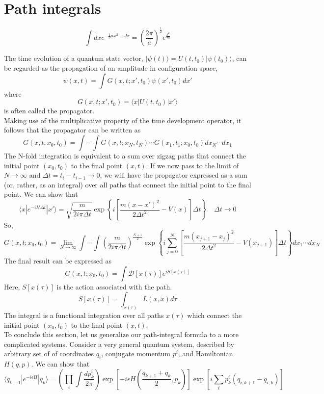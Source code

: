 \section{Path integrals}
\begin{newthem}
\[\int dx e^{-\frac{1}{2} ax^2 + Jx} = \left( \frac{2\pi}{a}\right)^{\frac{1}{2}} e^{\frac{J^2}{2a}}\]
\end{newthem}
The time evolution of a quantum state vector, $|\psi(t)\rangle = U(t,t_0)| \psi(t_0)\rangle$, can be regarded as the propagation of an amplitude in configuration space,
\[\psi(x,t) = \int G(x,t;x',t_0) \psi(x',t_0)dx'\]
where
\[G(x,t;x',t_0) = \langle x | U(t,t_0) | x' \rangle\]
is often called the propagator. \\
Making use of the multiplicative property of the time development operator, it follows that the propagator can be written as
\[G(x,t;x_0,t_0) = \int \cdots \int G(x,t;x_N,t_N) \cdots G(x_1,t_1;x_0,t_0) dx_N \cdots dx_1\]
The N-fold integration is equivalent to a sum over zigzag paths that connect the initial point $(x_0,t_0)$ to the final point $(x,t)$. If we now pass to the limit of $N \to \infty$ and $\Delta t = t_i - t_{i-1} \to 0$, we will have the propagator expressed as a sum (or, rather, as an integral) over all paths
that connect the initial point to the final point.
We can show that
\[\langle x | e^{-iH \Delta t} | x' \rangle = \sqrt{\frac{m}{2i\pi\Delta t}} \exp \left\{ i\left[ \frac{m(x-x')^2}{2\Delta t^2}   -V(x) \right] \Delta t \right\} \quad \Delta t \to 0 \]
So,
\[G(x,t;x_0,t_0) = \lim_{N \to \infty} \int \cdots \int \left(\frac{m}{2i\pi\Delta t}\right)^{\frac{N+1}{2}} \exp \left\{ i \sum_{j=0}^{N}\left[ \frac{m(x_{j+1}-x_{j})^2}{2\Delta t^2}   -V(x_{j+1}) \right] \Delta t \right\} dx_1 \cdots dx_N\]
The final result can be expressed as
\[G(x,t;x_0,t_0) = \int \mathcal{D}[x(\tau)] e^{iS[x(\tau)]}\]
Here, $S[x(\tau)]$ is the action associated with the path.
\[S[x(\tau)] = \int_{x(\tau)} L(x,\dot{x}) d\tau\]
The integral is a functional integration over all paths $x(\tau)$ which connect the initial point $(x_0,t_0)$ to the final point $(x,t)$.\\
To conclude this section, let us generalize our path-integral formula to a more complicated systems. Consider a very general quantum system, described by arbitrary set of of coordinates $q_i$, conjugate momentum $p^i$, and Hamiltonian $H(q,p)$. 
We can show that
\[\langle q_{k+1} | e^{-i\epsilon H} | q_{k}\rangle = \left( \prod_i \int \frac{dp^i_k}{2\pi}\right) \exp \left[ -i\epsilon H \left( \frac{q_{k+1}+q_{k}}{2},p_k\right) \right] \exp \left[ i \sum_i p_k^i (q_{i,k+1} - q_{i,k})\right] \] 
